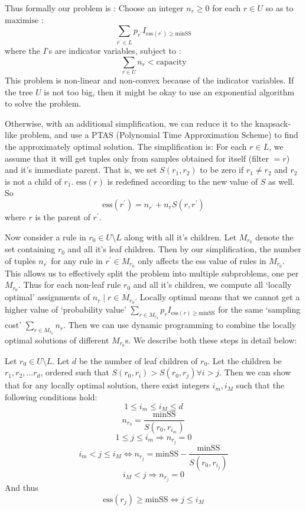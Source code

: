 \documentclass{sig-alternate}
\newcounter{prob}
\begin{document}
Thus formally our problem is :
Choose an integer $n_r \geq 0$ for each $r \in U$ so as to $\textrm{maximise}$ :
$$\sum_{r^{\prime} \in L} p_{r^{\prime}}I_{\text{ess}(r^{\prime}) \geq \text{minSS}}$$
where the $I$'s are indicator variables, subject to :
$$\sum_{r \in U} n_r < \text{capacity}$$
This problem is non-linear and non-convex because of the indicator variables. If the tree $U$ is not too big, then it might be okay to use an exponential algorithm to solve the problem. 

Otherwise, with an additional simplification, we can reduce it to the knapsack-like problem, and use a PTAS (Polynomial Time Approximation Scheme) to find the approximately optimal solution. The simplification is: For each $r \in L$, we assume that it will get tuples only from samples obtained for itself (filter $= r$) and it's immediate parent. That is, we set $S(r_1, r_2)$ to be zero if $r_1 \neq r_2$ and $r_2$ is not a child of $r_1$. $\text{ess}(r)$ is redefined according to the new value of $S$ as well. So $$\text{ess}(r^{\prime}) = n_{r^{\prime}} + n_rS(r, r^{\prime})$$ where $r$ is the parent of $r^{\prime}$. 

Now consider a rule in $r_0 \in U \setminus L$ along with all it's children. Let $M_{r_0}$ denote the set containing $r_0$ and all it's leaf children. Then by our simplification, the number of tuples $n_{r^{\prime}}$ for any rule in $r^{\prime} \in M_{r_0}$ only affects the ess value of rules in $M_{r_0}$. This allows us to effectively split the problem into multiple subproblems, one per $M_{r_0}$. Thus for each non-leaf rule $r_0$ and all it's children, we compute all `locally optimal' assignments of $n_r \mid r \in M_{r_0}$. Locally optimal means that we cannot get a higher value of `probability value' $\sum_{r \in M_{r_0}} p_rI_{\text{ess}(r) \geq \text{minSS}}$ for the same `sampling cost' $\sum_{r\in M_{r_0}} n_r$. Then we can use dynamic programming to combine the locally optimal solutions of different $M_{r_0}$s. We describe both these steps in detail below:

Let $r_0 \in U \setminus L$. Let $d$ be the number of leaf children of $r_0$. Let the children be $r_1, r_2, ... r_d$, ordered such that $S(r_0, r_i) > S(r_0, r_j) \forall i > j$. Then we can show that for any locally optimal solution, there exist integers $i_m, i_M$ such that the following conditions hold:
$$1 \leq i_m \leq i_M \leq d$$
$$n_{r_0} = \frac{\text{minSS}}{S(r_0, r_{i_m})}$$
$$1 \leq j \leq i_m \Rightarrow n_{r_j} = 0$$
$$i_m < j \leq i_M \Leftrightarrow n_{r_j} = \text{minSS} - \frac{\text{minSS}}{S(r_0, r_{i_j})}$$
$$i_M < j \Rightarrow n_{r_j} = 0$$
And thus
$$\text{ess}(r_j) \geq \text{minSS} \Leftrightarrow j \leq i_M$$
\end{document}
